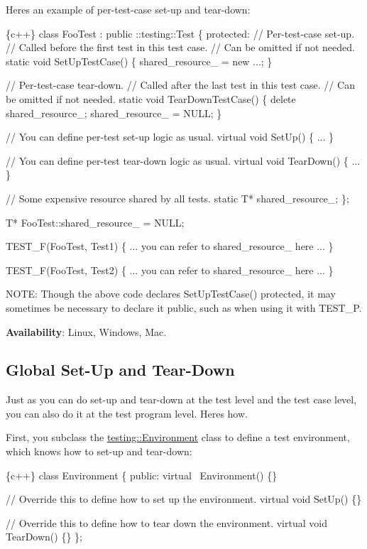 Here\textquotesingle{}s an example of per-\/test-\/case set-\/up and tear-\/down\+:


\begin{DoxyCode}
\{c++\}
class FooTest : public ::testing::Test \{
 protected:
  // Per-test-case set-up.
  // Called before the first test in this test case.
  // Can be omitted if not needed.
  static void SetUpTestCase() \{
    shared\_resource\_ = new ...;
  \}

  // Per-test-case tear-down.
  // Called after the last test in this test case.
  // Can be omitted if not needed.
  static void TearDownTestCase() \{
    delete shared\_resource\_;
    shared\_resource\_ = NULL;
  \}

  // You can define per-test set-up logic as usual.
  virtual void SetUp() \{ ... \}

  // You can define per-test tear-down logic as usual.
  virtual void TearDown() \{ ... \}

  // Some expensive resource shared by all tests.
  static T* shared\_resource\_;
\};

T* FooTest::shared\_resource\_ = NULL;

TEST\_F(FooTest, Test1) \{
  ... you can refer to shared\_resource\_ here ...
\}

TEST\_F(FooTest, Test2) \{
  ... you can refer to shared\_resource\_ here ...
\}
\end{DoxyCode}


N\+O\+TE\+: Though the above code declares {\ttfamily Set\+Up\+Test\+Case()} protected, it may sometimes be necessary to declare it public, such as when using it with {\ttfamily T\+E\+S\+T\+\_\+P}.

{\bfseries Availability}\+: Linux, Windows, Mac.

\subsection*{Global Set-\/\+Up and Tear-\/\+Down}

Just as you can do set-\/up and tear-\/down at the test level and the test case level, you can also do it at the test program level. Here\textquotesingle{}s how.

First, you subclass the {\ttfamily \hyperlink{classtesting_1_1Environment}{testing\+::\+Environment}} class to define a test environment, which knows how to set-\/up and tear-\/down\+:


\begin{DoxyCode}
\{c++\}
class Environment \{
 public:
  virtual ~Environment() \{\}

  // Override this to define how to set up the environment.
  virtual void SetUp() \{\}

  // Override this to define how to tear down the environment.
  virtual void TearDown() \{\}
\};
\end{DoxyCode}


